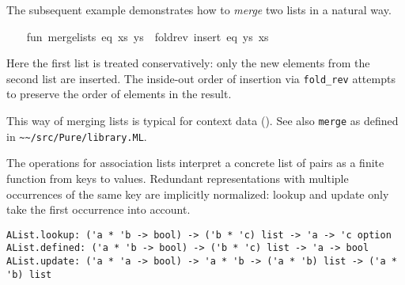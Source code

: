 \begin{isabellebody}
\begin{isamarkuptext}
The subsequent example demonstrates how to \emph{merge} two
  lists in a natural way.%
\end{isamarkuptext}%
\isamarkuptrue%
%
\isadelimML
%
\endisadelimML
%
\isatagML
{}\isamarkupfalse%
\ {}\isanewline
\ \ fun\ merge{}lists\ eq\ {}xs{}\ ys{}\ {}\ fold{}rev\ {}insert\ eq{}\ ys\ xs{}\isanewline
{}%
\endisatagML
{\isafoldML}%
%
\isadelimML
%
\endisadelimML
%
\begin{isamarkuptext}%
Here the first list is treated conservatively: only the new
  elements from the second list are inserted.  The inside-out order of
  insertion via \verb|fold_rev| attempts to preserve the order of
  elements in the result.

  This way of merging lists is typical for context data
  ().  See also \verb|merge| as defined in
  \verb|~~/src/Pure/library.ML|.%
\end{isamarkuptext}%
\isamarkuptrue%
%
\isamarkuptrue%
%
\begin{isamarkuptext}%
The operations for association lists interpret a concrete list
  of pairs as a finite function from keys to values.  Redundant
  representations with multiple occurrences of the same key are
  implicitly normalized: lookup and update only take the first
  occurrence into account.%
\end{isamarkuptext}%
\isamarkuptrue%
%
\begin{isamarkuptext}%
\begin{mldecls}
  \verb|AList.lookup: ('a * 'b -> bool) -> ('b * 'c) list -> 'a -> 'c option| \\
  \verb|AList.defined: ('a * 'b -> bool) -> ('b * 'c) list -> 'a -> bool| \\
  \verb|AList.update: ('a * 'a -> bool) -> 'a * 'b -> ('a * 'b) list -> ('a * 'b) list| \\
  \end{mldecls}

  \begin{description}


\end{description}
\end{isamarkuptext}
\end{isabellebody}
